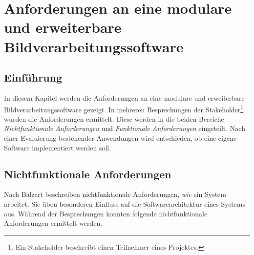 \chapter{Anforderungen an eine modulare und erweiterbare Bildverarbeitungssoftware}\label{anforderungen}

\section{Einführung}

In diesem Kapitel werden die Anforderungen an eine modulare und erweiterbare Bildverarbeitungssoftware gezeigt. In mehreren Besprechungen der Stakeholder\footnote{Ein Stakeholder beschreibt einen Teilnehmer eines Projektes.} wurden die Anforderungen ermittelt. Diese werden in die beiden Bereiche \textit{Nichtfunktionale Anforderungen} und \textit{Funktionale Anforderungen} eingeteilt. Nach einer Evaluierung bestehender Anwendungen wird entschieden, ob eine eigene Software implementiert werden soll.


\section{Nichtfunktionale Anforderungen}

Nach Balzert \cite[9]{balzert:swa} beschreiben nichtfunktionale Anforderungen, \textit{wie} ein System arbeitet. Sie üben besonderen Einfluss auf die Softwarearchitektur eines Systems aus.
Während der Besprechungen konnten folgende nichtfunktionale Anforderungen ermittelt werden.

